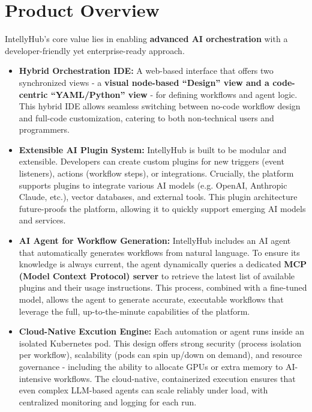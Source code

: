 \documentclass[11pt, a4paper, oneside]{article}
\begin{document}
\section{Product Overview}
IntellyHub's core value lies in enabling \textbf{advanced AI orchestration} with a developer-friendly yet enterprise-ready approach.
\begin{itemize}
    \item \textbf{Hybrid Orchestration IDE:} A web-based interface that offers two synchronized views - a \textbf{visual node-based “Design” view and a code-centric “YAML/Python” view} - for defining workflows and agent logic. This hybrid IDE allows seamless switching between no-code workflow design and full-code customization, catering to both non-technical users and programmers.
    
    \item \textbf{Extensible AI Plugin System:} IntellyHub is built to be modular and extensible. Developers can create custom plugins for new triggers (event listeners), actions (workflow steps), or integrations. Crucially, the platform supports plugins to integrate various AI models (e.g. OpenAI, Anthropic Claude, etc.), vector databases, and external tools. This plugin architecture future-proofs the platform, allowing it to quickly support emerging AI models and services.
    
    \item \textbf{AI Agent for Workflow Generation:} IntellyHub includes an AI agent that automatically generates workflows from natural language. To ensure its knowledge is always current, the agent dynamically queries a dedicated \textbf{MCP (Model Context Protocol) server} to retrieve the latest list of available plugins and their usage instructions. This process, combined with a fine-tuned model, allows the agent to generate accurate, executable workflows that leverage the full, up-to-the-minute capabilities of the platform.
    
    \item \textbf{Cloud-Native Excution Engine:} Each automation or agent runs inside an isolated Kubernetes pod. This design offers strong security (process isolation per workflow), scalability (pods can spin up/down on demand), and resource governance - including the ability to allocate GPUs or extra memory to AI-intensive workflows. The cloud-native, containerized execution ensures that even complex LLM-based agents can scale reliably under load, with centralized monitoring and logging for each run.
    

\end{itemize}
\end{document}
